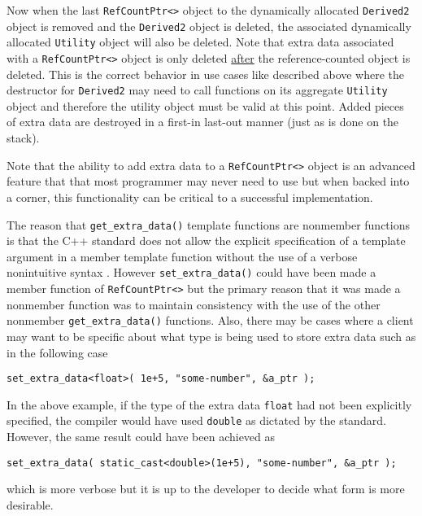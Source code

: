 {}\noindent{}Now when the last {}\texttt{RefCountPtr<>} object to the
dynamically allocated {}\texttt{Derived2} object is removed and the
{}\texttt{Derived2} object is deleted, the associated dynamically
allocated {}\texttt{Utility} object will also be deleted.  Note that
extra data associated with a {}\texttt{RefCountPtr<>} object is only
deleted \underline{after} the reference-counted object is deleted.
This is the correct behavior in use cases like described above where
the destructor for {}\texttt{Derived2} may need to call functions on
its aggregate {}\texttt{Utility} object and therefore the utility
object must be valid at this point.  Added pieces of extra data are
destroyed in a first-in last-out manner (just as is done on the
stack).

Note that the ability to add extra data to a {}\texttt{RefCountPtr<>}
object is an advanced feature that that most programmer may never need
to use but when backed into a corner, this functionality can be
critical to a successful implementation.

The reason that {}\texttt{get\-\_extra\-\_data()} template functions
are nonmember functions is that the C++ standard does not allow the
explicit specification of a template argument in a member template
function without the use of a verbose nonintuitive syntax
{}\cite[C.13.6]{ref:stroustrup_2000}.  However
{}\texttt{set\-\_extra\-\_data()} could have been made a member
function of {}\texttt{RefCountPtr<>} but the primary reason that it
was made a nonmember function was to maintain consistency with the use
of the other nonmember {}\texttt{get\-\_extra\-\_data()} functions.
Also, there may be cases where a client may want to be specific about
what type is being used to store extra data such as in the following
case

{\scriptsize\begin{verbatim}
set_extra_data<float>( 1e+5, "some-number", &a_ptr );
\end{verbatim}}

{}\noindent{}In the above example, if the type of the extra data
{}\texttt{float} had not been explicitly specified, the compiler
would have used {}\texttt{double} as dictated by the standard.
However, the same result could have been achieved as

{\scriptsize\begin{verbatim}
set_extra_data( static_cast<double>(1e+5), "some-number", &a_ptr );
\end{verbatim}}

{}\noindent{}which is more verbose but it is up to the developer to
decide what form is more desirable.

